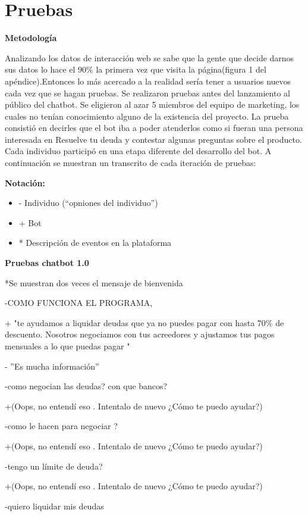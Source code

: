 \chapter{Pruebas}
\textbf{Metodología}

Analizando los datos de interacción web se sabe que la gente que decide darnos sus datos lo hace el 90\% la primera vez que visita la página(figura 1 del apéndice).Entonces lo más acercado a la realidad sería tener a usuarios nuevos cada vez que se hagan pruebas.
Se realizaron pruebas antes del lanzamiento al público del chatbot. Se eligieron al azar 5 miembros del equipo de marketing, los cuales no tenían conocimiento alguno de la existencia del proyecto. La prueba consistió en decirles que el bot iba a poder atenderlos como si fueran una persona interesada en Resuelve tu deuda y contestar algunas preguntas sobre el producto. Cada individuo participó en una etapa diferente del desarrollo del bot. A continuación se muestran un transcrito de cada iteración de pruebas:

\textbf{Notación:}
\begin{itemize}
\item -  Individuo (“opniones del individuo”)
\item + Bot
\item *  Descripción de eventos en la plataforma
\end{itemize}



\textbf{Pruebas chatbot 1.0}


*Se muestran dos veces el mensaje de bienvenida

-COMO FUNCIONA EL PROGRAMA,

+ "te ayudamos a liquidar deudas que ya no puedes pagar con hasta 70\% de descuento. Nosotros negociamos con tus acreedores y ajustamos tus pagos mensuales a lo que puedas pagar "

- ”Es mucha información”

-como negocian las deudas? con que bancos?

+(Oops, no entendí eso . Intentalo de nuevo ¿Cómo te puedo ayudar?)

-como le hacen para negociar ?

+(Oops, no entendí eso . Intentalo de nuevo ¿Cómo te puedo ayudar?)

-tengo un límite de deuda?

+(Oops, no entendí eso . Intentalo de nuevo ¿Cómo te puedo ayudar?)

-quiero liquidar mis deudas

